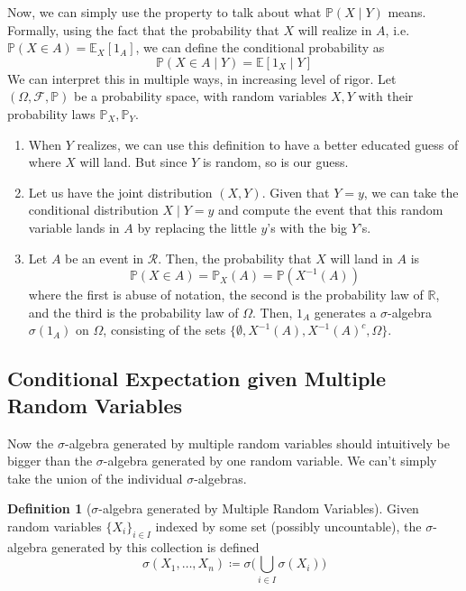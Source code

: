 \documentclass{article}
\theoremstyle{definition}
\theoremstyle{remark}
\theoremstyle{definition}
\newtheorem{definition}{Definition}[section]
\begin{document}
Now, we can simply use the property to talk about what $\mathbb{P}(X \mid Y)$ means. Formally, using the fact that the probability that $X$ will realize in $A$, i.e. $\mathbb{P}(X \in A) = \mathbb{E}_X[1_A]$, we can define the conditional probability as 
\[\mathbb{P}(X \in A \mid Y) = \mathbb{E}[ 1_X \mid Y] \]
We can interpret this in multiple ways, in increasing level of rigor. Let $(\Omega, \mathcal{F}, \mathbb{P})$ be a probability space, with random variables $X, Y$ with their probability laws $\mathbb{P}_X, \mathbb{P}_Y$. 
\begin{enumerate}
    \item When $Y$ realizes, we can use this definition to have a better educated guess of where $X$ will land. But since $Y$ is random, so is our guess. 
    
    \item Let us have the joint distribution $(X, Y)$. Given that $Y = y$, we can take the conditional distribution $X \mid Y = y$ and compute the event that this random variable lands in $A$ by replacing the little $y$'s with the big $Y$'s. 
    
    \item Let $A$ be an event in $\mathcal{R}$. Then, the probability that $X$ will land in $A$ is 
    \[\mathbb{P}(X \in A) = \mathbb{P}_X(A) = \mathbb{P}(X^{-1} (A))\]
    where the first is abuse of notation, the second is the probability law of $\mathbb{R}$, and the third is the probability law of $\Omega$. Then, $1_A$ generates a $\sigma$-algebra $\sigma(1_A)$ on $\Omega$, consisting of the sets $\{\emptyset, X^{-1}(A), X^{-1}(A)^c, \Omega\}$. 
\end{enumerate}

\subsection{Conditional Expectation given Multiple Random Variables}

Now the $\sigma$-algebra generated by multiple random variables should intuitively be bigger than the $\sigma$-algebra generated by one random variable. We can't simply take the union of the individual $\sigma$-algebras. 

\begin{definition}[$\sigma$-algebra generated by Multiple Random Variables]
Given random variables $\{X_i\}_{i \in I}$ indexed by some set (possibly uncountable), the $\sigma$-algebra generated by this collection is defined 
\[\sigma(X_1, \ldots, X_n) \coloneqq \sigma \bigg( \bigcup_{i \in I} \sigma(X_i) \bigg) \]
\end{definition}
\end{document}
